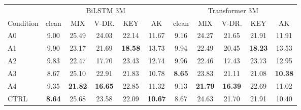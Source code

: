 \begin{tabular}{lcccccccccc}
\toprule
& \multicolumn{5}{c}{BiLSTM 3M} & \multicolumn{5}{c}{Transformer 3M} \\
\cmidrule(lr){2-6}\cmidrule(lr){7-11}
Condition & clean & MIX & V-DR. & KEY & AK & clean & MIX & V-DR. & KEY & AK \\
\midrule
A0 & 9.00 & 25.49 & 24.03 & 22.14 & 11.67 & 9.16 & 24.27 & 21.65 & 21.91 & 11.91 \\
A1 & 9.90 & 23.17 & 21.69 & \textbf{18.58} & 13.73 & 9.94 & 22.49 & 20.45 & \textbf{18.23} & 13.53 \\
A2 & 9.83 & 22.47 & 17.70 & 23.43 & 12.74 & 9.96 & 22.46 & 17.43 & 23.73 & 12.95 \\
A3 & 8.67 & 25.10 & 22.91 & 21.83 & 10.78 & \textbf{8.65} & 23.83 & 21.11 & 21.08 & \textbf{10.38} \\
A4 & 9.35 & \textbf{21.82} & \textbf{16.65} & 22.85 & 11.32 & 9.13 & \textbf{21.79} & \textbf{16.39} & 22.69 & 11.02 \\
CTRL & \textbf{8.64} & 25.68 & 23.58 & 22.09 & \textbf{10.67} & 8.67 & 24.63 & 21.70 & 21.91 & 10.40 \\
\bottomrule
\end{tabular}